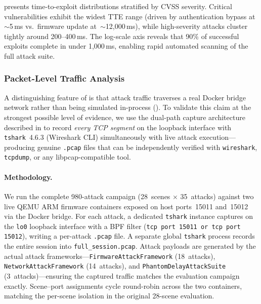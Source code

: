 



 presents time-to-exploit distributions
stratified by CVSS severity.  Critical vulnerabilities exhibit the
widest TTE range (driven by authentication bypass at~$\sim$5\,ms vs.\
firmware update at~$\sim$12{,}000\,ms), while high-severity attacks
cluster tightly around 200--400\,ms.  The log-scale axis reveals
that 90\% of successful exploits complete in under 1{,}000\,ms,
enabling rapid automated scanning of the full attack suite.

\subsubsection{Packet-Level Traffic Analysis}\label{sec:eval-pcap}

A distinguishing feature of \sys{} is that attack traffic traverses
a real Docker bridge network rather than being simulated in-process
(\Cref{sec:home-network}).
To validate this claim at the strongest possible level of evidence,
we use the dual-path capture architecture described in
 to record \emph{every TCP segment} on
the loopback interface with \texttt{tshark}~4.6.3 (Wireshark CLI)
simultaneously with live attack execution---producing genuine
\texttt{.pcap} files that can be independently verified with
\texttt{wireshark}, \texttt{tcpdump}, or any libpcap-compatible
tool.

\paragraph{Methodology.}
We run the complete 980-attack campaign (28~scenes $\times$
35~attacks) against two live QEMU ARM firmware containers exposed
on host ports~15011 and~15012 via the Docker bridge.  For each
attack, a dedicated \texttt{tshark} instance captures on the
\texttt{lo0} loopback interface with a BPF filter
(\texttt{tcp port 15011 or tcp port 15012}), writing a per-attack
\texttt{.pcap} file.  A separate global \texttt{tshark} process
records the entire session into \texttt{full\_session.pcap}.
Attack payloads are generated by the actual \sys{} attack
frameworks---\texttt{FirmwareAttackFramework} (18~attacks),
\texttt{NetworkAttackFramework} (14~attacks), and
\texttt{PhantomDelayAttackSuite} (3~attacks)---ensuring the
captured traffic matches the evaluation campaign exactly.
Scene--port assignments cycle round-robin across the two containers,
matching the per-scene isolation in the original 28-scene evaluation.

